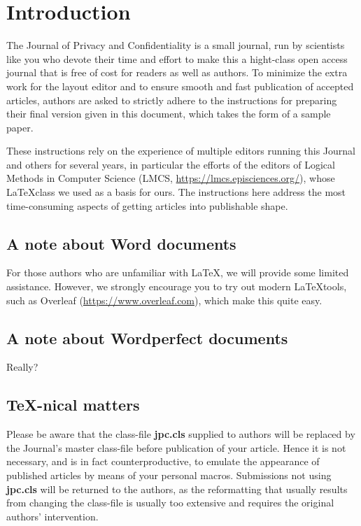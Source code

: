 \documentclass{jpc} %
\theoremstyle{plain}\newtheorem{satz}[thm]{Satz} %
\begin{document}
\maketitle

\section*{Introduction}\label{S:one}

  The Journal of Privacy and Confidentiality is a small journal, run
  by scientists like you who devote their time and effort to make this
  a hight-class open access journal that is free of cost for readers
  as well as authors.  To minimize the extra work for the layout
  editor and to ensure smooth and fast publication of accepted
  articles, authors are asked to strictly adhere to the instructions
  for preparing their final version given in this document, which
  takes the form of a sample paper.

  These instructions rely on the experience of multiple editors running this
  Journal and others for several years, in particular the efforts of the editors of Logical Methods in Computer Science (LMCS, \url{https://lmcs.episciences.org/}), whose \LaTeX class we used as a basis for ours.  The instructions here address the most time-consuming
  aspects of getting articles into publishable shape. 
  
\subsection*{A note about Word documents}
For those authors who are unfamiliar with \LaTeX, we will provide some limited assistance. However, we strongly encourage you to try out modern \LaTeX tools, such as Overleaf (\url{https://www.overleaf.com}), which make this quite easy. 


\subsection*{A note about Wordperfect documents}
Really?

\subsection*{\TeX-nical matters}

  Please be aware that the class-file {\bf jpc.cls} supplied to 
  authors will be replaced by the Journal's master class-file before
  publication of your article.  Hence it is not necessary, and is in
  fact counterproductive, to emulate the appearance of published
  articles by means of your personal macros.  Submissions not using
  {\bf jpc.cls} will be returned to the authors, as the reformatting
  that usually results from changing the class-file is usually too
  extensive and requires the original authors' intervention.
\end{document}
